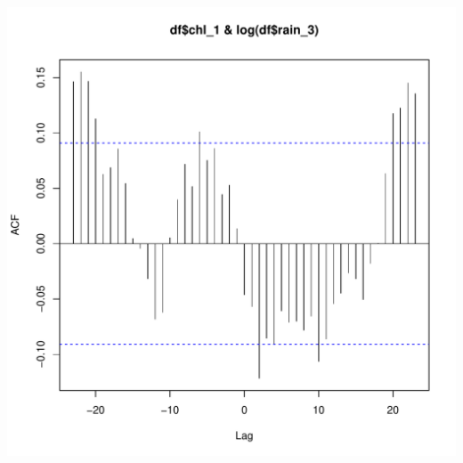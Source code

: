 \documentclass{article}\usepackage[]{graphicx}\usepackage[]{color}
\makeatletter
\def\maxwidth{ %
  \ifdim\Gin@nat@width>\linewidth
    \linewidth
  \else
    \Gin@nat@width
  \fi
}
\newenvironment{knitrout}{}{} %
\makeatother
\begin{document}
\begin{knitrout}
\includegraphics[width=\maxwidth]{figure/unnamed-chunk-25-2} 

\end{knitrout}
\end{document}
